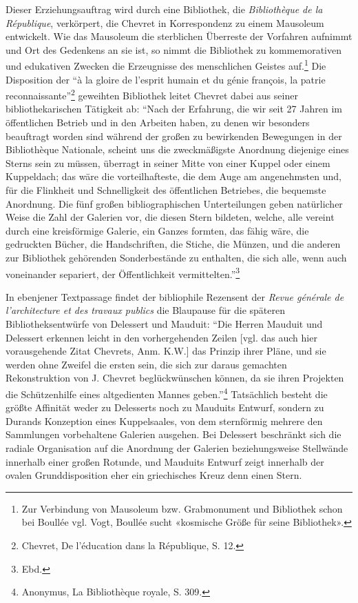 Dieser Erziehungsauftrag wird durch eine Bibliothek, die
\emph{Bibliothèque de la République}, verkörpert, die Chevret in
Korrespondenz zu einem Mausoleum entwickelt. Wie das Mausoleum die
sterblichen Überreste der Vorfahren aufnimmt und Ort des Gedenkens an
sie ist, so nimmt die Bibliothek zu kommemorativen und edukativen
Zwecken die Erzeugnisse des menschlichen Geistes auf.\footnote{Zur
  Verbindung von Mausoleum bzw. Grabmonument und Bibliothek schon bei
  Boullée vgl. Vogt, Boullée sucht «kosmische Größe für seine
  Bibliothek».} Die Disposition der \enquote{à la gloire de l'esprit
humain et du génie françois, la patrie reconnaissante}\footnote{Chevret,
  De l'éducation dans la République, S. 12.} geweihten Bibliothek leitet
Chevret dabei aus seiner bibliothekarischen Tätigkeit ab: \enquote{Nach
der Erfahrung, die wir seit 27 Jahren im öffentlichen Betrieb und in den
Arbeiten haben, zu denen wir besonders beauftragt worden sind während
der großen zu bewirkenden Bewegungen in der Bibliothèque Nationale,
scheint uns die zweckmäßigste Anordnung diejenige eines Sterns sein zu
müssen, überragt in seiner Mitte von einer Kuppel oder einem Kuppeldach;
das wäre die vorteilhafteste, die dem Auge am angenehmsten und, für die
Flinkheit und Schnelligkeit des öffentlichen Betriebes, die bequemste
Anordnung. Die fünf großen bibliographischen Unterteilungen geben
natürlicher Weise die Zahl der Galerien vor, die diesen Stern bildeten,
welche, alle vereint durch eine kreisförmige Galerie, ein Ganzes
formten, das fähig wäre, die gedruckten Bücher, die Handschriften, die
Stiche, die Münzen, und die anderen zur Bibliothek gehörenden
Sonderbestände zu enthalten, die sich alle, wenn auch voneinander
separiert, der Öffentlichkeit vermittelten.}\footnote{Ebd.}

In ebenjener Textpassage findet der bibliophile Rezensent der
\emph{Revue générale de l'architecture et des travaux publics} die
Blaupause für die späteren Bibliotheksentwürfe von Delessert und
Mauduit: \enquote{Die Herren Mauduit und Delessert erkennen leicht in
den vorhergehenden Zeilen {[}vgl. das auch hier vorausgehende Zitat
Chevrets, Anm. K.W.{]} das Prinzip ihrer Pläne, und sie werden ohne
Zweifel die ersten sein, die sich zur daraus gemachten Rekonstruktion
von J. Chevret beglückwünschen können, da sie ihren Projekten die
Schützenhilfe eines altgedienten Mannes geben.}\footnote{Anonymus, La
  Bibliothèque royale, S. 309.} Tatsächlich besteht die größte Affinität
weder zu Delesserts noch zu Mauduits Entwurf, sondern zu Durands
Konzeption eines Kuppelsaales, von dem sternförmig mehrere den
Sammlungen vorbehaltene Galerien ausgehen. Bei Delessert beschränkt sich
die radiale Organisation auf die Anordnung der Galerien beziehungsweise
Stellwände innerhalb einer großen Rotunde, und Mauduits Entwurf zeigt
innerhalb der ovalen Grunddisposition eher ein griechisches Kreuz denn
einen Stern.

